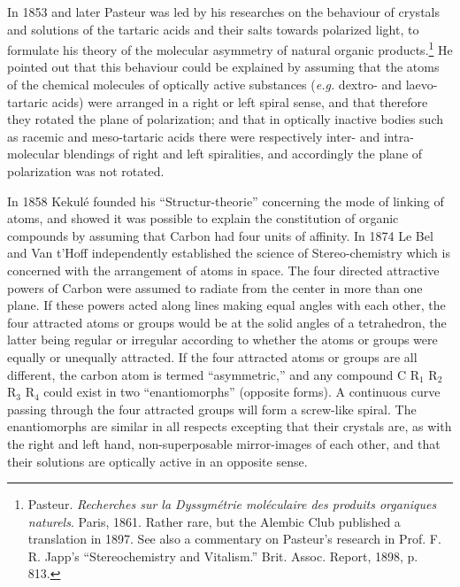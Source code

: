 \documentclass[a4paper, 12pt, oneside]{article}
\begin{document}
In 1853 and later Pasteur was led by his researches on the behaviour of crystals and solutions of the tartaric acids and their salts towards polarized light, to formulate his theory of the molecular asymmetry of natural organic products.\footnote{Pasteur. \emph{Recherches sur la Dyssymétrie moléculaire des produits organiques naturels}. Paris, 1861. Rather rare, but the Alembic Club published a translation in 1897. See also a commentary on Pasteur's research in Prof. F. R. Japp's ``Stereochemistry and Vitalism.'' Brit. Assoc. Report, 1898, p. 813.} He pointed out that this behaviour could be explained by assuming that the atoms of the chemical molecules of optically active substances (\emph{e.g.} dextro- and laevo-tartaric acids) were arranged in a right or left spiral sense, and that therefore they rotated the plane of polarization; and that in optically inactive bodies such as racemic and meso-tartaric acids there were respectively inter- and intra-molecular blendings of right and left spiralities, and accordingly the plane of polarization was not rotated.

In 1858 Kekulé founded his ``Structur-theorie'' concerning the mode of linking of atoms, and showed it was possible to explain the constitution of organic compounds by assuming that Carbon had four units of affinity. In 1874 Le Bel and Van t'Hoff independently established the science of Stereo-chemistry which is concerned with the arrangement of atoms in space. The four directed attractive powers of Carbon were assumed to radiate from the center in more than one plane. If these powers acted along lines making equal angles with each other, the four attracted atoms or groups would be at the solid angles of a tetrahedron, the latter being regular or irregular according to whether the atoms or groups were equally or unequally attracted. If the four attracted atoms or groups are all different, the carbon atom is termed ``asymmetric,'' and any compound C R$_{1}$ R$_{2}$ R$_{3}$ R$_{4}$ could exist in two ``enantiomorphs'' (opposite forms). A continuous curve passing through the four attracted groups will form a screw-like spiral. The enantiomorphs are similar in all respects excepting that their crystals are, as with the right and left hand, non-superposable mirror-images of each other, and that their solutions are optically active in an opposite sense.
\end{document}
